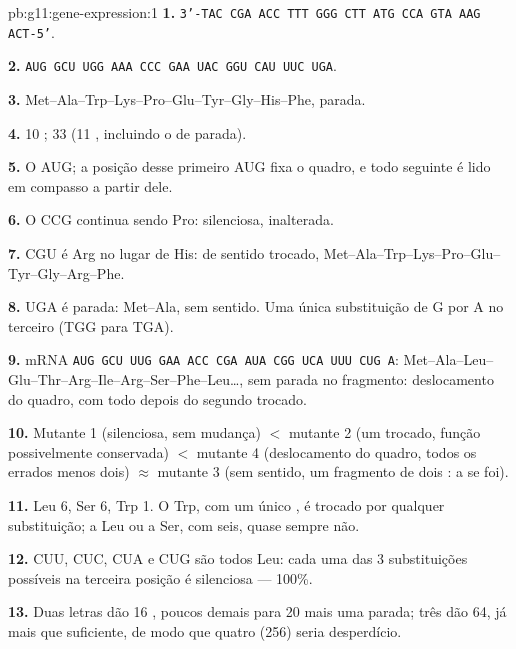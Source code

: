 \begin{solution}{pb:g11:gene-expression:1}
\textbf{1.} \texttt{3'-TAC CGA ACC TTT GGG CTT ATG CCA GTA AAG ACT-5'}.

\textbf{2.} \texttt{AUG GCU UGG AAA CCC GAA UAC GGU CAU UUC UGA}.

\textbf{3.} Met--Ala--Trp--Lys--Pro--Glu--Tyr--Gly--His--Phe, parada.

\textbf{4.} 10 ; 33  (11 , incluindo o de
parada).

\textbf{5.} O AUG; a posição desse primeiro AUG fixa o quadro, e todo
 seguinte é lido em compasso a partir dele.

\textbf{6.} O CCG continua sendo Pro: silenciosa,  inalterada.

\textbf{7.} CGU é Arg no lugar de His: de sentido trocado,
Met--Ala--Trp--Lys--Pro--Glu--Tyr--Gly--Arg--Phe.

\textbf{8.} UGA é parada: Met--Ala, sem sentido. Uma única substituição
de G por A no terceiro  (TGG para TGA).

\textbf{9.} mRNA \texttt{AUG GCU UUG GAA ACC CGA AUA CGG UCA UUU CUG
A}: Met--Ala--Leu--Glu--Thr--Arg--Ile--Arg--Ser--Phe--Leu\dots, sem
parada no fragmento: deslocamento do quadro, com todo 
depois do segundo trocado.

\textbf{10.} Mutante 1 (silenciosa, sem mudança) $<$ mutante 2 (um
 trocado, função possivelmente conservada) $<$ mutante 4
(deslocamento do quadro, todos os  errados menos dois)
$\approx$ mutante 3 (sem sentido, um fragmento de dois : a
 se foi).

\textbf{11.} Leu 6, Ser 6, Trp 1. O Trp, com um único , é trocado
por qualquer substituição; a Leu ou a Ser, com seis, quase sempre não.

\textbf{12.} CUU, CUC, CUA e CUG são todos Leu: cada uma das 3
substituições possíveis na terceira posição é silenciosa --- 100\%.

\textbf{13.} Duas letras dão 16 , poucos demais para 20
 mais uma parada; três dão 64, já mais que suficiente, de
modo que quatro (256) seria desperdício.


\end{solution}
